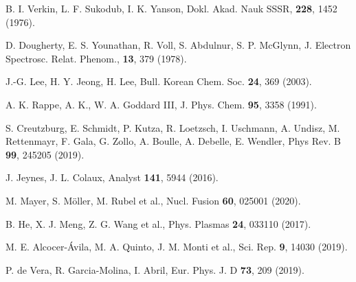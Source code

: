 \begin{thebibliography}{9}
B. I. Verkin, L. F. Sukodub, I. K. Yanson, 
Dokl. Akad. Nauk SSSR, \textbf{228}, 1452 (1976).

D. Dougherty, E. S. Younathan, R. Voll, S. Abdulnur, S. P. McGlynn,
J. Electron Spectrosc. Relat. Phenom., \textbf{13}, 379 (1978).

J.-G. Lee, H. Y. Jeong, H. Lee, 
Bull. Korean Chem. Soc. \textbf{24}, 369 (2003).

A. K. Rappe, A. K., W. A. Goddard III,
J. Phys. Chem. \textbf{95}, 3358 (1991).



S. Creutzburg, E. Schmidt, P. Kutza, R. Loetzsch, I. Uschmann,
A. Undisz, M. Rettenmayr, F. Gala, G. Zollo, A. Boulle, A.
Debelle, E. Wendler, 
Phys Rev. B \textbf{99}, 245205 (2019).

J. Jeynes, J. L. Colaux, 
Analyst \textbf{141}, 5944 (2016).

M. Mayer, S. M\"oller, M. Rubel et al., 
Nucl. Fusion \textbf{60}, 025001 (2020).

B. He, X. J. Meng, Z. G. Wang et al., 
Phys. Plasmas \textbf{24}, 033110 (2017).

M. E. Alcocer-Ávila, M. A. Quinto, J. M. Monti et al.,
Sci. Rep. \textbf{9}, 14030 (2019).

P. de Vera, R. Garcia-Molina, I. Abril, 
Eur. Phys. J. D \textbf{73}, 209 (2019).


\end{thebibliography}
